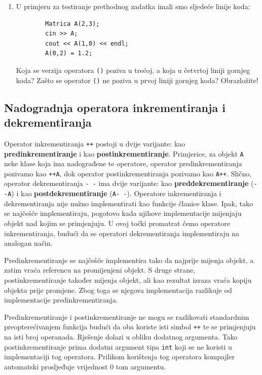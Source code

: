 \begin{razmisljanje}
    \begin{enumerate}
        \item 
        U primjeru za testiranje prethodnog zadatka imali
        smo sljedeće linije koda:
    \begin{verbatim}
        Matrica A(2,3);
        cin >> A;
        cout << A(1,0) << endl;
        A(0,2) = 1.2;
    \end{verbatim}
    Koja se verzija operatora \texttt{()} poziva u trećoj,
    a koja u četvrtoj liniji gornjeg koda?
    Zašto se operator \texttt{()} ne poziva u prvoj liniji gornjeg koda? Obrazložite!
    \end{enumerate}
\end{razmisljanje}


\subsection{Nadogradnja operatora inkrementiranja i dekrementiranja}

Operator inkrementiranja \texttt{++} postoji u dvije varijante:
kao \textbf{predinkrementiranje} i kao
\textbf{postinkrementiranje}.
Primjerice, za objekt \texttt{A} neke klase koja ima nadograđene te operatore,
operator predinkrementiranja pozivamo kao \texttt{++A},
dok operator postinkrementiranja pozivamo kao \texttt{A++}.
Slično, operator dekrementiranja \texttt{-\!\!\! -} ima dvije varijante:
kao \textbf{preddekrementiranje} (\texttt{-\!\!\! -A})
i kao \textbf{postdekrementiranje} (\texttt{A-\!\!\! -}).
Operatore inkrementiranja i dekrementiranja nije nužno implementirati kao funkcije članice klase.
Ipak, tako se najčešće implementiraju, pogotovo kada njihove implementacije mijenjaju objekt nad kojim se primjenjuju.
U ovoj točki promatrat ćemo operatore inkrementiranja,
budući da se operatori dekrementiranja implementiraju
na analogan način.
\medskip

Predinkrementiranje se najčešće implementira tako da
najprije mijenja objekt, 
a zatim vraća referencu na promijenjeni objekt.
S druge strane,
postinkrementiranje također mijenja objekt, ali kao rezultat izraza vraća kopiju objekta prije promjene. 
Zbog toga se njegova implementacija razlikuje od implementacije predinkrementiranja.
\medskip

Predinkrementiranje i postinkrementiranje ne mogu se
razlikovati standardnim preopterećivanjem funkcija
budući da oba koriste isti simbol \texttt{++}
te se primjenjuju na isti broj operanada.
Rješenje dolazi u obliku dodatnog argumenta.
Tako postinkrementiranje prima dodatni argument tipa  \texttt{int}
koji se ne koristi u implementaciji tog operatora. Prilikom korištenja tog operatora kompajler automatski prosljeđuje vrijednost 0 tom argumentu.


